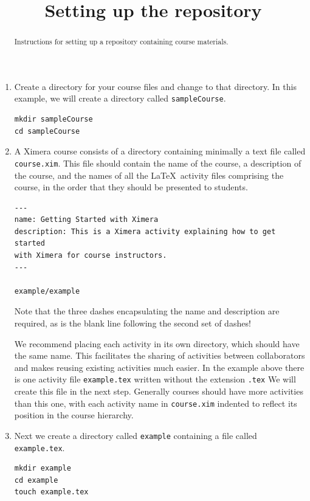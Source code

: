 \documentclass{ximera}
\title{Setting up the repository}
\begin{document}
\begin{abstract}
Instructions for setting up a repository containing course materials.
\end{abstract}
\maketitle
\begin{enumerate}
\item Create a directory for your course files
and change to that directory.
In this example, we will create a directory called \verb!sampleCourse!.
\begin{center}
\begin{verbatim}
mkdir sampleCourse
cd sampleCourse 
\end{verbatim}
\end{center}
\item A Ximera course consists of a directory containing
minimally a text file called \verb!course.xim!. This file should contain
the name of the course, a description of the course,
and the names of all the \LaTeX\ activity files 
comprising the course, in the order
that they should be presented to students.


\begin{verbatim}
---
name: Getting Started with Ximera
description: This is a Ximera activity explaining how to get started
with Ximera for course instructors.
---

example/example
\end{verbatim}

\begin{warning}
Note that the three dashes encapsulating the name and description
are required, as is the blank line following the second set of dashes!
\end{warning}

We recommend placing each
activity in its own directory, which should have the same name.
This facilitates the
sharing of activities between collaborators and makes reusing existing
activities much easier.
In the example above
there is one activity file \verb!example.tex!
written without the extension \verb!.tex! We will
create this file in the next step.
Generally courses should have more activities than this
one, with each activity name in \verb!course.xim!
indented to reflect its position in the course hierarchy.

\item Next we create a directory
called \verb!example! containing a file called \verb!example.tex!.
\begin{verbatim}
mkdir example
cd example
touch example.tex
\end{verbatim}


\end{enumerate}
\end{document}
